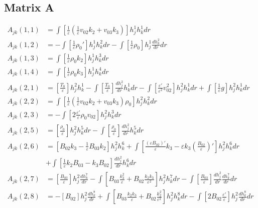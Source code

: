 \documentclass[11pt, fleqn]{article}
\newcommand{\eps}{\varepsilon}
\begin{document}
\subsection{Matrix A}
\begingroup
\allowdisplaybreaks
\addtolength{\jot}{10pt}

\begin{align*}
	A_{jk}(1, 1) &=  \int \left[\frac{1}{\eps}\left(\frac{1}{\eps}v_{02}k_2 + v_{03}k_3\right)\right] h_j^1 h_k^1 dr									\\
	A_{jk}(1, 2) &= -\int \left[\frac{1}{\eps}\rho_0'\right] h_j^1 h_k^2 dr - \int  \left[\frac{1}{\eps}\rho_0\right] h_j^1 \frac{dh_k^2}{dr} dr		\\
	A_{jk}(1, 3) &=  \int \left[\frac{1}{\eps}\rho_0 k_2\right] h_j^1 h_k^3 dr																			\\
	A_{jk}(1, 4) &=  \int \left[\frac{1}{\eps}\rho_0 k_3\right] h_j^1 h_k^4 dr																			\\
	A_{jk}(2, 1) &=  \left[\frac{T_0}{\eps}\right] h_j^2 h_k^1 - \int \left[\frac{T_0}{\eps}\right] \frac{dh_j^2}{dr} h_k^1 dr - \int \left[\frac{\eps'}{\eps^2}v_{02}^2\right]h_j^2h_k^1 dr + \int \left[\frac{1}{\eps}g\right]h_j^2h_k^1 dr			\\
	A_{jk}(2, 2) &=  \int \left[\frac{1}{\eps}\left(\frac{1}{\eps}v_{02}k_2 + v_{03}k_3\right)\rho_0\right]h_j^2h_k^2 dr								\\
	A_{jk}(2, 3) &= -\int \left[2\frac{\eps'}{\eps}\rho_0v_{02}\right]h_j^2 h_k^3 dr																	\\
	A_{jk}(2, 5) &=  \left[\frac{\rho_0}{\eps}\right]h_j^2 h_k^5 dr - \int \left[\frac{\rho_0}{\eps}\right]\frac{dh_j^2}{dr}h_k^5 dr					\\
	A_{jk}(2, 6) &=  \left[B_{02}k_3 - \frac{1}{\eps}B_{03}k_2\right] h_j^2 h_k^6 + \int \left[\frac{(\eps B_{02})'}{\eps}k_3 - \eps k_3\left(\frac{B_{02}}{\eps}\right)'\right] h_j^2 h_k^6 dr		\\
				 &+  \int \left[\frac{1}{\eps}k_2B_{03} - k_3B_{02}\right]\frac{dh_j^2}{dr}h_k^6 dr 			\\
	A_{jk}(2, 7) &=  \left[\frac{B_{03}}{\eps}\right] h_j^2 \frac{dh_k^7}{dr} - \int \left[B_{03}\frac{k_3^2}{\eps} + B_{02}\frac{k_2k_3}{\eps^2}\right] h_j^2 h_k^7 dr - \int \left[\frac{B_{03}}{\eps}\right]\frac{dh_j^2}{dr}\frac{dh_k^7}{dr}dr		\\
	A_{jk}(2, 8) &=  -\left[B_{02}\right]h_j^2\frac{dh_k^8}{dr} + \int \left[B_{03}\frac{k_2k_3}{\eps} + B_{02}\frac{k_2^2}{\eps^2}\right] h_j^2 h_k^8 dr - \int \left[2B_{02}\frac{\eps'}{\eps}\right]h_j^2 \frac{dh_k^8}{dr} dr	

\end{align*}
\end{document}
